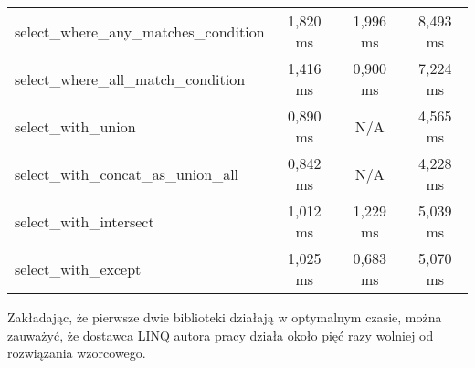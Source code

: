 \begin{table}[h]
\begin{tabular}{l|ccc}
select\_where\_any\_matches\_condition  & 1,820 ms             & 1,996 ms          & 8,493 ms             \\
select\_where\_all\_match\_condition    & 1,416 ms             & 0,900 ms          & 7,224 ms             \\
select\_with\_union                     & 0,890 ms             & N/A               & 4,565 ms             \\
select\_with\_concat\_as\_union\_all    & 0,842 ms             & N/A               & 4,228 ms             \\
select\_with\_intersect                 & 1,012 ms             & 1,229 ms          & 5,039 ms             \\
select\_with\_except                    & 1,025 ms             & 0,683 ms          & 5,070 ms    
\end{tabular}
\end{table}

\vspace{0.1in}
Zakładając, że pierwsze dwie biblioteki działają w optymalnym czasie, można zauważyć, że dostawca LINQ autora pracy działa około pięć razy wolniej od rozwiązania wzorcowego.